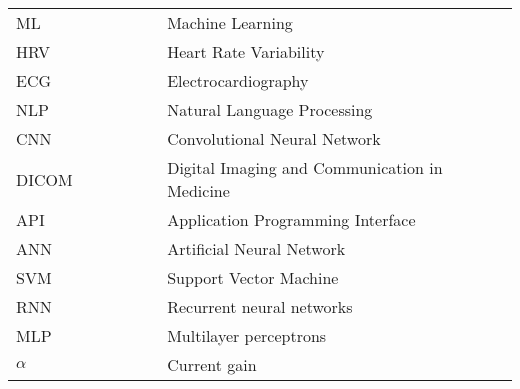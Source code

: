 
\abbreviations
\begin{tabular}{p{0.3\linewidth}p{2\linewidth}}
    ML & Machine Learning\\
    HRV & Heart
    Rate Variability \\
    ECG & Electrocardiography \\
    NLP & Natural Language Processing \\
	CNN& Convolutional Neural Network \\
        DICOM & Digital Imaging and Communication in Medicine \\
        API & Application Programming Interface \\
        ANN & Artificial Neural Network \\
        

    SVM & Support Vector Machine \\
    RNN & Recurrent neural networks \\
    MLP & Multilayer perceptrons \\
        $\alpha$ & Current gain
        
	
        	\end{tabular}
        	
